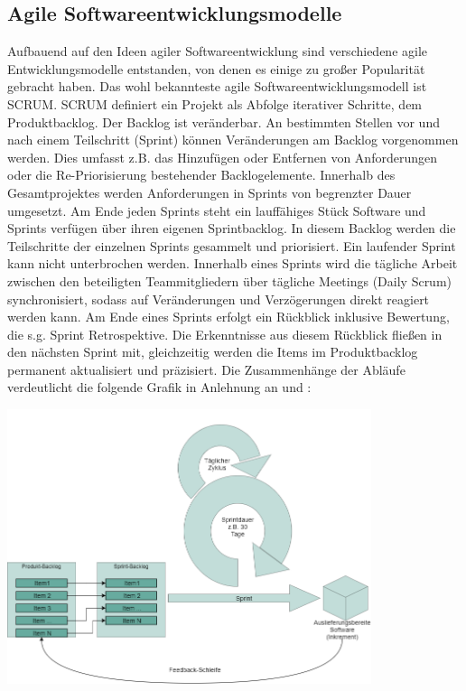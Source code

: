 \subsection{Agile Softwareentwicklungsmodelle}
\label{Agile Softwareentwicklungsmodelle}
Aufbauend auf den Ideen agiler Softwareentwicklung sind verschiedene agile Entwicklungsmodelle entstanden, von denen es einige zu großer Popularität gebracht haben. Das wohl bekannteste agile Softwareentwicklungsmodell ist \gls{SCRUM}.\newline
\gls{SCRUM} definiert ein Projekt als Abfolge iterativer Schritte, dem Produktbacklog. Der Backlog ist veränderbar. An bestimmten Stellen vor und nach einem Teilschritt (Sprint) können Veränderungen am Backlog vorgenommen werden. Dies umfasst z.B. das Hinzufügen oder Entfernen von Anforderungen oder die Re-Priorisierung bestehender Backlogelemente. Innerhalb des Gesamtprojektes werden Anforderungen in Sprints von begrenzter Dauer umgesetzt. Am Ende jeden Sprints steht ein lauffähiges Stück Software und Sprints verfügen über ihren eigenen Sprintbacklog. In diesem Backlog werden die Teilschritte der einzelnen Sprints gesammelt und priorisiert. Ein laufender Sprint kann nicht unterbrochen werden. Innerhalb eines Sprints wird die tägliche Arbeit zwischen den beteiligten Teammitgliedern über tägliche Meetings (Daily Scrum) synchronisiert, sodass auf Veränderungen und Verzögerungen direkt reagiert werden kann. Am Ende eines Sprints erfolgt ein Rückblick inklusive Bewertung, die s.g. Sprint Retrospektive. Die Erkenntnisse aus diesem Rückblick fließen in den nächsten Sprint mit, gleichzeitig werden die Items im Produktbacklog permanent aktualisiert und präzisiert. Die Zusammenhänge der Abläufe verdeutlicht die folgende Grafik in Anlehnung an \cite{SCRUM_Framework_nodate} und \cite[Abb. 1]{moniruzzaman2013comparative}:

\begin{center}
    \includegraphics[width=0.8\textwidth]{Grafiken/SCRUM.png}
    \label{Grafik:Ablauf des SCRUM-Modells}
\end{center}

